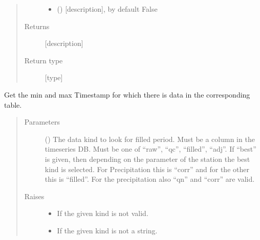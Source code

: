 \documentclass[letterpaper,10pt,english]{sphinxmanual}
\begin{document}
\begin{fulllineitems}
\begin{fulllineitems}
\begin{quote}
\begin{description}
\begin{itemize}
\item {} 
\sphinxAtStartPar
{} (\sphinxstyleliteralemphasis{\sphinxupquote{, }}) \textendash{} {[}description{]}, by default False

\end{itemize}

\item[{Returns}] \leavevmode
\sphinxAtStartPar
{[}description{]}

\item[{Return type}] \leavevmode
\sphinxAtStartPar
{[}type{]}

\end{description}\end{quote}

\end{fulllineitems}


\begin{fulllineitems}
\label{\detokenize{weatherDB:weatherDB.station.StationBase.get_filled_period}}
\sphinxAtStartPar
Get the min and max Timestamp for which there is data in the corresponding table.
\begin{quote}\begin{description}
\item[{Parameters}] \leavevmode
\sphinxAtStartPar
{} () \textendash{} The data kind to look for filled period.
Must be a column in the timeseries DB.
Must be one of “raw”, “qc”, “filled”, “adj”.
If “best” is given, then depending on the parameter of the station the best kind is selected.
For Precipitation this is “corr” and for the other this is “filled”.
For the precipitation also “qn” and “corr” are valid.

\item[{Raises}] \leavevmode\begin{itemize}
\item {} 
\sphinxAtStartPar
{} \textendash{} If the given kind is not valid.

\item {} 
\sphinxAtStartPar
{} \textendash{} If the given kind is not a string.


\end{itemize}
\end{description}
\end{quote}
\end{fulllineitems}
\end{fulllineitems}
\end{document}
